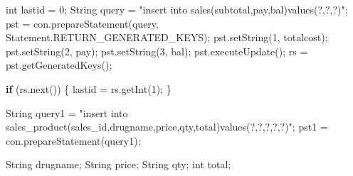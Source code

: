\documentclass[
  10pt,
]{article}
\newenvironment{Shaded}{}{}
\newcommand{\BuiltInTok}[1]{\textcolor[rgb]{0.00,0.50,0.00}{#1}}
\newcommand{\ControlFlowTok}[1]{\textcolor[rgb]{0.00,0.44,0.13}{\textbf{#1}}}
\newcommand{\DataTypeTok}[1]{\textcolor[rgb]{0.56,0.13,0.00}{#1}}
\newcommand{\DecValTok}[1]{\textcolor[rgb]{0.25,0.63,0.44}{#1}}
\newcommand{\FunctionTok}[1]{\textcolor[rgb]{0.02,0.16,0.49}{#1}}
\newcommand{\NormalTok}[1]{#1}
\newcommand{\OperatorTok}[1]{\textcolor[rgb]{0.40,0.40,0.40}{#1}}
\newcommand{\StringTok}[1]{\textcolor[rgb]{0.25,0.44,0.63}{#1}}
\begin{document}
\begin{Shaded}
\begin{Highlighting}[numbers=left,,]
        \DataTypeTok{int}\NormalTok{ lastid }\OperatorTok{=} \DecValTok{0}\OperatorTok{;}
        \BuiltInTok{String}\NormalTok{ query }\OperatorTok{=} \StringTok{"insert into sales(subtotal,pay,bal)values(?,?,?)"}\OperatorTok{;}
\NormalTok{        pst }\OperatorTok{=}\NormalTok{ con}\OperatorTok{.}\FunctionTok{prepareStatement}\OperatorTok{(}\NormalTok{query}\OperatorTok{,} \BuiltInTok{Statement}\OperatorTok{.}\FunctionTok{RETURN\_GENERATED\_KEYS}\OperatorTok{);}
\NormalTok{        pst}\OperatorTok{.}\FunctionTok{setString}\OperatorTok{(}\DecValTok{1}\OperatorTok{,}\NormalTok{ totalcost}\OperatorTok{);}
\NormalTok{        pst}\OperatorTok{.}\FunctionTok{setString}\OperatorTok{(}\DecValTok{2}\OperatorTok{,}\NormalTok{ pay}\OperatorTok{);}
\NormalTok{        pst}\OperatorTok{.}\FunctionTok{setString}\OperatorTok{(}\DecValTok{3}\OperatorTok{,}\NormalTok{ bal}\OperatorTok{);}
\NormalTok{        pst}\OperatorTok{.}\FunctionTok{executeUpdate}\OperatorTok{();}
\NormalTok{        rs }\OperatorTok{=}\NormalTok{ pst}\OperatorTok{.}\FunctionTok{getGeneratedKeys}\OperatorTok{();}

        \ControlFlowTok{if} \OperatorTok{(}\NormalTok{rs}\OperatorTok{.}\FunctionTok{next}\OperatorTok{())} \OperatorTok{\{}
\NormalTok{            lastid }\OperatorTok{=}\NormalTok{ rs}\OperatorTok{.}\FunctionTok{getInt}\OperatorTok{(}\DecValTok{1}\OperatorTok{);}
        \OperatorTok{\}}

        \BuiltInTok{String}\NormalTok{ query1 }\OperatorTok{=} \StringTok{"insert into sales\_product(sales\_id,drugname,price,qty,total)values(?,?,?,?,?)"}\OperatorTok{;}
\NormalTok{        pst1 }\OperatorTok{=}\NormalTok{ con}\OperatorTok{.}\FunctionTok{prepareStatement}\OperatorTok{(}\NormalTok{query1}\OperatorTok{);}

        \BuiltInTok{String}\NormalTok{ drugname}\OperatorTok{;}
        \BuiltInTok{String}\NormalTok{ price}\OperatorTok{;}
        \BuiltInTok{String}\NormalTok{ qty}\OperatorTok{;}
        \DataTypeTok{int}\NormalTok{ total}\OperatorTok{;}


\end{Highlighting}
\end{Shaded}
\end{document}
